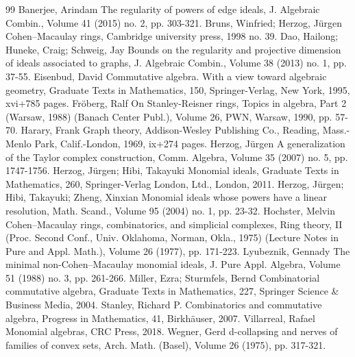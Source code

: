 \documentclass[10pt]{amsart}
\theoremstyle{definition}
\begin{document}
\begin{thebibliography}{99}
 Banerjee, Arindam The regularity of powers of edge ideals, J. Algebraic Combin., Volume 41 (2015) no. 2, pp. 303-321.
 Bruns, Winfried; Herzog, Jürgen Cohen–Macaulay rings, Cambridge university press, 1998 no. 39.
 Dao, Hailong; Huneke, Craig; Schweig, Jay Bounds on the regularity and projective dimension of ideals associated to graphs, J. Algebraic Combin., Volume 38 (2013) no. 1, pp. 37-55.
 Eisenbud, David Commutative algebra. With a view toward algebraic geometry, Graduate Texts in Mathematics, 150, Springer-Verlag, New York, 1995, xvi+785 pages.
 Fröberg, Ralf On Stanley-Reisner rings, Topics in algebra, Part 2 (Warsaw, 1988) (Banach Center Publ.), Volume 26, PWN, Warsaw, 1990, pp. 57-70.
 Harary, Frank Graph theory, Addison-Wesley Publishing Co., Reading, Mass.-Menlo Park, Calif.-London, 1969, ix+274 pages.
 Herzog, Jürgen A generalization of the Taylor complex construction, Comm. Algebra, Volume 35 (2007) no. 5, pp. 1747-1756.
 Herzog, Jürgen; Hibi, Takayuki Monomial ideals, Graduate Texts in Mathematics, 260, Springer-Verlag London, Ltd., London, 2011.
 Herzog, Jürgen; Hibi, Takayuki; Zheng, Xinxian Monomial ideals whose powers have a linear resolution, Math. Scand., Volume 95 (2004) no. 1, pp. 23-32.
 Hochster, Melvin Cohen–Macaulay rings, combinatorics, and simplicial complexes, Ring theory, II (Proc. Second Conf., Univ. Oklahoma, Norman, Okla., 1975) (Lecture Notes in Pure and Appl. Math.), Volume 26 (1977), pp. 171-223.
 Lyubeznik, Gennady The minimal non-Cohen–Macaulay monomial ideals, J. Pure Appl. Algebra, Volume 51 (1988) no. 3, pp. 261-266.
 Miller, Ezra; Sturmfels, Bernd Combinatorial commutative algebra, Graduate Texts in Mathematics, 227, Springer Science \& Business Media, 2004.
 Stanley, Richard P. Combinatorics and commutative algebra, Progress in Mathematics, 41, Birkhäuser, 2007.
 Villarreal, Rafael Monomial algebras, CRC Press, 2018.
 Wegner, Gerd d-collapsing and nerves of families of convex sets, Arch. Math. (Basel), Volume 26 (1975), pp. 317-321.
\end{thebibliography}
\end{document}
